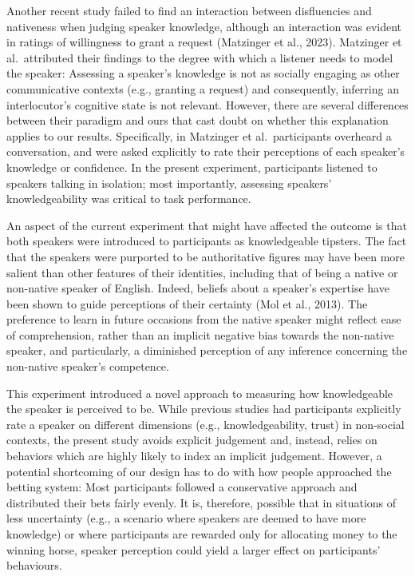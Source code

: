 \documentclass[
  man,floatsintext]{apa7}
\begin{document}
Another recent study failed to find an interaction between disfluencies and nativeness when judging speaker knowledge, although an interaction was evident in ratings of willingness to grant a request (Matzinger et al., 2023). Matzinger et al.~attributed their findings to the degree with which a listener needs to model the speaker: Assessing a speaker's knowledge is not as socially engaging as other communicative contexts (e.g., granting a request) and consequently, inferring an interlocutor's cognitive state is not relevant. However, there are several differences between their paradigm and ours that cast doubt on whether this explanation applies to our results. Specifically, in Matzinger et al.~participants overheard a conversation, and were asked explicitly to rate their perceptions of each speaker's knowledge or confidence. In the present experiment, participants listened to speakers talking in isolation; most importantly, assessing speakers' knowledgeability was critical to task performance.

An aspect of the current experiment that might have affected the outcome is that both speakers were introduced to participants as knowledgeable tipsters. The fact that the speakers were purported to be authoritative figures may have been more salient than other features of their identities, including that of being a native or non-native speaker of English. Indeed, beliefs about a speaker's expertise have been shown to guide perceptions of their certainty (Mol et al., 2013). The preference to learn in future occasions from the native speaker might reflect ease of comprehension, rather than an implicit negative bias towards the non-native speaker, and particularly, a diminished perception of any inference concerning the non-native speaker's competence.

This experiment introduced a novel approach to measuring how knowledgeable the speaker is perceived to be. While previous studies had participants explicitly rate a speaker on different dimensions (e.g., knowledgeability, trust) in non-social contexts, the present study avoids explicit judgement and, instead, relies on behaviors which are highly likely to index an implicit judgement. However, a potential shortcoming of our design has to do with how people approached the betting system: Most participants followed a conservative approach and distributed their bets fairly evenly. It is, therefore, possible that in situations of less uncertainty (e.g., a scenario where speakers are deemed to have more knowledge) or where participants are rewarded only for allocating money to the winning horse, speaker perception could yield a larger effect on participants' behaviours.
\end{document}
